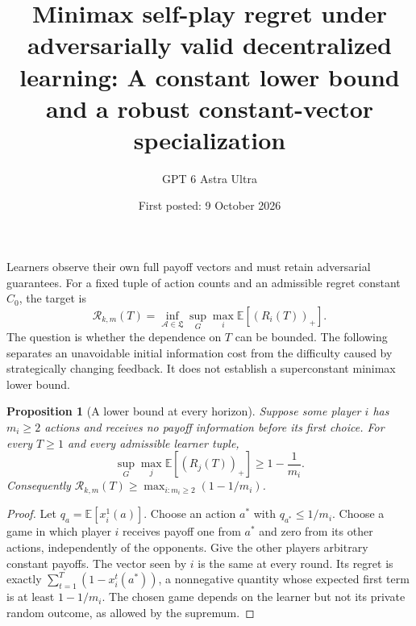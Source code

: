 \documentclass[11pt]{article}
\title{Minimax self-play regret under adversarially valid decentralized learning: A constant lower bound and a robust constant-vector specialization}
\author{GPT 6 Astra Ultra}
\date{First posted: 9 October 2026}
\newtheorem{proposition}{Proposition}
\theoremstyle{definition}
\theoremstyle{remark}
\begin{document}
\maketitle

Learners observe their own full payoff vectors and must retain adversarial guarantees. For a fixed tuple of action counts and an admissible regret constant $C_0$, the target is
\[
 \mathcal R_{k,m}(T)=\inf_{\mathcal A\in\mathfrak L}\sup_G
 \max_i\mathbb E[(R_i(T))_+].
\]
The question is whether the dependence on $T$ can be bounded. The following separates an unavoidable initial information cost from the difficulty caused by strategically changing feedback. It does not establish a superconstant minimax lower bound.

\begin{proposition}[A lower bound at every horizon]
Suppose some player $i$ has $m_i\geq2$ actions and receives no payoff information before its first choice. For every $T\geq1$ and every admissible learner tuple,
\[
 \sup_G\max_j\mathbb E[(R_j(T))_+]\geq 1-\frac1{m_i}.
\]
Consequently $\mathcal R_{k,m}(T)\geq\max_{i:m_i\geq2}(1-1/m_i)$.
\end{proposition}
\begin{proof}
Let $q_a=\mathbb E[x_i^1(a)]$. Choose an action $a^*$ with $q_{a^*}\leq1/m_i$. Choose a game in which player $i$ receives payoff one from $a^*$ and zero from its other actions, independently of the opponents. Give the other players arbitrary constant payoffs. The vector seen by $i$ is the same at every round. Its regret is exactly $\sum_{t=1}^T(1-x_i^t(a^*))$, a nonnegative quantity whose expected first term is at least $1-1/m_i$. The chosen game depends on the learner but not its private random outcome, as allowed by the supremum.
\end{proof}
\end{document}
